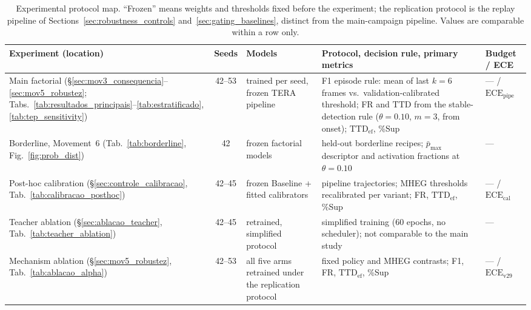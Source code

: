 \documentclass[a4paper,fleqn]{cas-dc}
\newcommand{\MHEG}{\mbox{MHEG}\xspace}
\begin{document}
\begin{table}[!tbp]
\color{\revcolor}
\centering
\caption{Experimental protocol map. ``Frozen'' means weights and thresholds
fixed before the experiment; the replication protocol is the replay pipeline
of Sections~\ref{sec:robustness_controls} and~\ref{sec:gating_baselines},
distinct from the main-campaign pipeline. Values are comparable within a row
only.}
\label{tab:protocol_map}
\scriptsize
\setlength{\tabcolsep}{2.8pt}
\renewcommand{\arraystretch}{1.18}
\begin{tabularx}{\textwidth}{>{\raggedright\arraybackslash}p{2.7cm}
  c >{\raggedright\arraybackslash}p{3.0cm} >{\raggedright\arraybackslash}X
  >{\raggedright\arraybackslash}p{2.4cm}}
\toprule
\textbf{Experiment (location)} & \textbf{Seeds} & \textbf{Models}
  & \textbf{Protocol, decision rule, primary metrics}
  & \textbf{Budget / ECE} \\
\midrule
Main factorial (\S\ref{sec:mov3_consequencia}--\ref{sec:mov5_robustez};
Tabs.~\ref{tab:resultados_principais}--\ref{tab:estratificado},
\ref{tab:tep_sensitivity}) & 42--53 & trained per seed, frozen TERA pipeline
  & F1 episode rule: mean of last $k{=}6$ frames vs.\ validation-calibrated
    threshold; FR and $\mathrm{TTD}$ from the stable-detection rule
    ($\theta{=}0.10$, $m{=}3$, from onset); $\mathrm{TTD}_{\mathrm{ef}}$, \%Sup
  & --- / $\mathrm{ECE}_{\mathrm{pipe}}$ \\
Borderline, Movement~6 (Tab.~\ref{tab:borderline},
Fig.~\ref{fig:prob_dist}) & 42 & frozen factorial models
  & held-out borderline recipes; $\bar{p}_{\max}$ descriptor and activation
    fractions at $\theta{=}0.10$ & --- \\
Post-hoc calibration (\S\ref{sec:controle_calibracao},
Tab.~\ref{tab:calibracao_posthoc}) & 42--45 & frozen Baseline + fitted
  calibrators & pipeline trajectories; \MHEG thresholds recalibrated per
  variant; FR, $\mathrm{TTD}_{\mathrm{ef}}$, \%Sup
  & --- / $\mathrm{ECE}_{\mathrm{cal}}$ \\
Teacher ablation (\S\ref{sec:ablacao_teacher},
Tab.~\ref{tab:teacher_ablation}) & 42--45 & retrained, simplified protocol
  & simplified training (60 epochs, no scheduler); not comparable to the main
    study & --- \\
Mechanism ablation (\S\ref{sec:mov5_robustez},
Tab.~\ref{tab:ablacao_alpha}) & 42--53 & all five arms retrained under the
  replication protocol & fixed policy and \MHEG contrasts; F1, FR,
  $\mathrm{TTD}_{\mathrm{ef}}$, \%Sup & --- / $\mathrm{ECE}_{\mathrm{v29}}$ \\

\end{tabularx}
\end{table}
\end{document}
